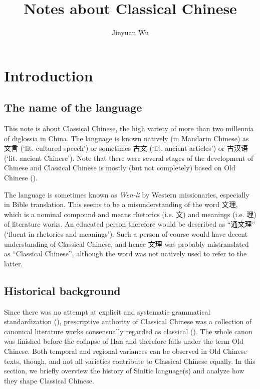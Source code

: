 \documentclass[UTF8, a4paper, oneside, scheme=plain, 12pt]{ctexrep}
\title{Notes about Classical Chinese}
\author{Jinyuan Wu}
\newcommand{\form}[1]{\emph{#1}}
\newcommand{\translate}[1]{`#1'}
\begin{document}
\automath

\maketitle

\chapter{Introduction}

\section{The name of the language}

This note is about Classical Chinese,
the high variety of more than two millennia of diglossia in China.
The language is known natively (in Mandarin Chinese) as 文言 (\translate{lit. cultured speech})
or sometimes 古文 (\translate{lit. ancient articles})
or 古汉语 (\translate{lit. ancient Chinese}).
Note that there were several stages of the development of Chinese
and Classical Chinese is mostly (but not completely) based on Old Chinese
().

The language is sometimes known as \form{Wen-li} by Western missionaries,
especially in Bible translation.
This seems to be a misunderstanding of the word 文理,
which is a nominal compound and means rhetorics (i.e. 文) and meanings (i.e. 理) of literature works.
An educated person therefore would be described as ``通文理'' (\translate{fluent in rhetorics and meanings}).
Such a person of course would have decent understanding of Classical Chinese,
and hence 文理 was probably mistranslated as ``Classical Chinese'',
although the word was not natively used to refer to the latter.

\section{Historical background}\label{sec:introduction.history}

Since there was no attempt at explicit and systematic grammatical standardization
(),
prescriptive authority of Classical Chinese was a collection of canonical literature works
consensually regarded as classical ().
The whole canon was finished before the collapse of Han
and therefore falls under the term Old Chinese.
Both temporal and regional variances can be observed in Old Chinese texts, though,
and not all varieties contribute to Classical Chinese equally.
In this section, we briefly overview the history of Sinitic language(s)
and analyze how they shape Classical Chinese.
\end{document}
